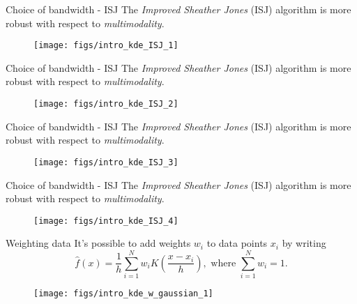 \documentclass[11pt, aspectratio=149]{beamer}
\theoremstyle{plain}
\begin{document}
\begin{frame}[fragile, t]{Choice of bandwidth - ISJ}
	The \emph{Improved Sheather Jones} (ISJ) algorithm is more robust with respect to \emph{multimodality}.
	\vfill
	\begin{figure}
		\centering
		\texttt{[image: figs/intro\_kde\_ISJ\_1]}
	\end{figure}
\end{frame}

\begin{frame}[fragile, t]{Choice of bandwidth - ISJ}
	The \emph{Improved Sheather Jones} (ISJ) algorithm is more robust with respect to \emph{multimodality}.
	\vfill
	\begin{figure}
		\centering
		\texttt{[image: figs/intro\_kde\_ISJ\_2]}
	\end{figure}
\end{frame}

\begin{frame}[fragile, t]{Choice of bandwidth - ISJ}
	The \emph{Improved Sheather Jones} (ISJ) algorithm is more robust with respect to \emph{multimodality}.
	\vfill
	\begin{figure}
		\centering
		\texttt{[image: figs/intro\_kde\_ISJ\_3]}
	\end{figure}
\end{frame}

\begin{frame}[fragile, t]{Choice of bandwidth - ISJ}
	The \emph{Improved Sheather Jones} (ISJ) algorithm is more robust with respect to \emph{multimodality}.
	\vfill
	\begin{figure}
		\centering
		\texttt{[image: figs/intro\_kde\_ISJ\_4]}
	\end{figure}
\end{frame}


\begin{frame}[fragile, t]{Weighting data}
	It's possible to add weights $w_i$ to data points $x_i$ by writing
	\begin{equation*}
	\hat{f}(x) = \frac{1}{h} \sum_{i=1}^{N} w_i K\left(\frac{x - x_i}{h}\right), \text{ where } \sum_{i=1}^{N} w_i = 1.
	\end{equation*}
	\vfill
	\begin{figure}
		\centering
		\texttt{[image: figs/intro\_kde\_w\_gaussian\_1]}
	\end{figure}
\end{frame}
\end{document}

